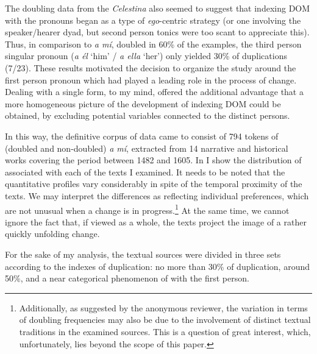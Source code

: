 \documentclass[output=paper]{LSP/langsci}
\begin{document}
 The doubling data from the \textit{Celestina} also seemed to suggest that indexing DOM with the pronouns began as a type of \textit{ego}-centric strategy (or one involving the speaker/hearer dyad, but second person tonics were too scant to appreciate this). Thus, in comparison to \textit{a mí}, doubled in 60\% of the examples, the third person singular pronoun (\textit{a él} ‘him’ / \textit{a ella} ‘her’) only yielded 30\% of duplications (7/23). These results motivated the decision to organize the study around the first person pronoun which had played a leading role in the process of change. Dealing with a single form, to my mind, offered the additional advantage that a more homogeneous picture of the development of indexing DOM could be obtained, by excluding potential variables connected to the distinct persons.

 In this way, the definitive corpus of data came to consist of 794 tokens of (doubled and non-doubled) \textit{a mí}, extracted from 14 narrative and historical works covering the period between 1482 and 1605. In  I show the distribution of  associated with each of the texts I examined. It needs to be noted that the quantitative profiles vary considerably in spite of the temporal proximity of the texts. We may interpret the differences as reflecting individual preferences, which are not unusual when a change is in progress.\footnote{Additionally, as suggested by the anonymous reviewer, the variation in terms of doubling frequencies may also be due to the involvement of distinct textual traditions in the examined sources. This is a question of great interest, which, unfortunately, lies beyond the scope of this paper.} At the same time, we cannot ignore the fact that, if viewed as a whole, the texts project the image of a rather quickly unfolding change. 

 For the sake of my analysis, the textual sources were divided in three sets according to the indexes of duplication: no more than 30\% of duplication, around 50\%, and a near categorical phenomenon of  with the first person. 
\end{document}
